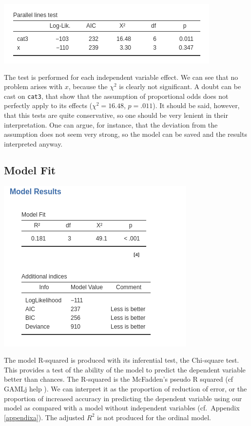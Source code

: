 \documentclass[
]{book}
\begin{document}
\includegraphics{bookletpics/3_ordinal_output7.png}

The test is performed for each independent variable effect. We can see that no problem arises with \(x\), because the \(\chi^2\) is clearly not significant. A doubt can be cast on \texttt{cat3}, that show that the assumption of proportional odds does not perfectly apply to its effects (\(\chi^2=16.48\), \(p=.011\)). It should be said, however, that this tests are quite conservative, so one should be very lenient in their interpretation. One can argue, for instance, that the deviation from the assumption does not seem very strong, so the model can be saved and the results interpreted anyway.

\hypertarget{model-fit-2}{%
\subsection{Model Fit}\label{model-fit-2}}

\includegraphics{bookletpics/3_ordinal_output2.png}

The model R-squared is produced with its inferential test, the Chi-square test. This provides a test of the ability of the model to predict the dependent variable better than chances. The R-squared is the McFadden's pseudo R squared (cf GAMLj help
). We can interpret it as the proportion of reduction of error, or the proportion of increased accuracy in predicting the dependent variable using our model as compared with a model without independent variables (cf.~Appendix \ref{appendixa}). The adjusted \(R^2\) is not produced for the ordinal model.
\end{document}
